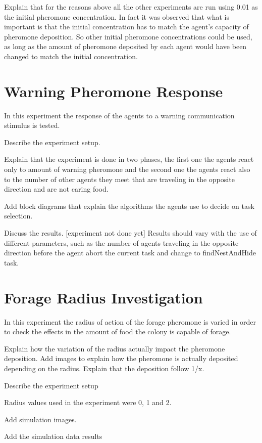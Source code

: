 Explain that for the reasons above all the other experiments are run using 0.01 as the initial pheromone concentration. In fact it was observed that what is important is that the initial concentration has to match the agent's capacity of pheromone deposition. So other initial pheromone concentrations could be used, as long as the amount of pheromone deposited by each agent would have been changed to match the initial concentration.

\section{Warning Pheromone Response}
In this experiment the response of the agents to a warning communication stimulus is tested.

Describe the experiment setup.

Explain that the experiment is done in two phases, the first one the agents react only to amount of warning pheromone and the second one the agents react also to the number of other agents they meet that are traveling in the opposite direction and are not caring food.

Add block diagrams that explain the algorithms the agents use to decide on task selection.

Discuss the results. [experiment not done yet]
Results should vary with the use of different parameters, such as the number of agents traveling in the opposite direction before the agent abort the current task and change to findNestAndHide task.

\section{Forage Radius Investigation}

In this experiment the radius of action of the forage pheromone is varied in order to check the effects in the amount of food the colony is capable of forage.

Explain how the variation of the radius actually impact the pheromone deposition. Add images to explain how the pheromone is actually deposited depending on the radius. Explain that the deposition follow 1/x.

Describe the experiment setup

Radius values used in the experiment were 0, 1 and 2.

Add simulation images.

Add the simulation data results

